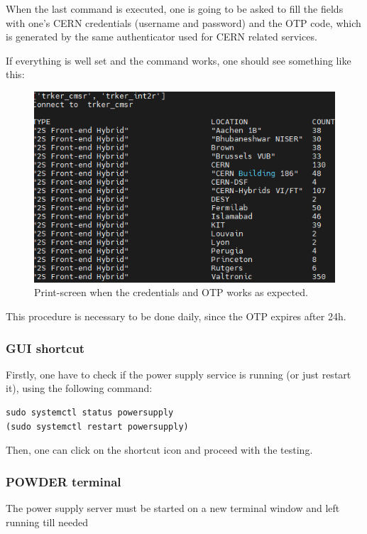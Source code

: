 \documentclass[10pt,a4paper]{article}
\begin{document}
When the last command is executed, one is going to be asked to fill the fields with one's CERN credentials (username and password) and the OTP code, which is generated by the same authenticator used for CERN related services. 

If everything is well set and the command works, one should see something like this: 

\begin{figure}[h!]
\centering
 \includegraphics[width=0.7\linewidth]{Pictures/otp-success.png} 
  \caption{Print-screen when the credentials and OTP works as expected.}
  \label{OTP}
\end{figure}

This procedure is necessary to be done daily, since the OTP expires after 24h.

\subsubsection{GUI shortcut}

Firstly, one have to check if the power supply service is running (or just restart it), using the following command:

\begin{framed}
\begin{verbatim}
sudo systemctl status powersupply
(sudo systemctl restart powersupply)
\end{verbatim}
\end{framed}

Then, one can click on the shortcut icon and proceed with the testing.

\subsubsection{POWDER terminal}

The power supply server must be started on a new terminal window and left running till needed
\end{document}
